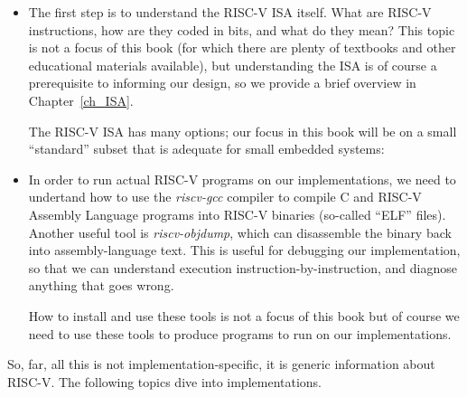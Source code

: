 \begin{itemize}

\item The first step is to understand the RISC-V ISA itself.  What are
    RISC-V instructions, how are they coded in bits, and what do they
    mean?  This topic is not a focus of this book (for which there are
    plenty of textbooks and other educational materials available),
    but understanding the ISA is of course a prerequisite to informing
    our design, so we provide a brief overview in
    Chapter~\ref{ch_ISA}.

    The RISC-V ISA has many options; our focus in this book will be on
    a small ``standard'' subset that is adequate for small embedded
    systems:


\item In order to run actual RISC-V programs on our implementations,
      we need to undertand how to use the \emph{riscv-gcc} compiler to
      compile C and RISC-V Assembly Language programs into RISC-V
      binaries (so-called ``ELF'' files).  Another useful tool is
      \emph{riscv-objdump}, which can disassemble the binary back into
      assembly-language text. This is useful for debugging our
      implementation, so that we can understand execution
      instruction-by-instruction, and diagnose anything that goes
      wrong.

      How to install and use these tools is not a focus of this book
      but of course we need to use these tools to produce programs to
      run on our implementations.

\end{itemize}

So, far, all this is not implementation-specific, {\ie} it is generic
information about RISC-V.  The following topics dive into
implementations.


